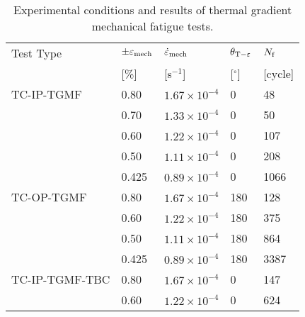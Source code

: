 \documentclass[preprint,5p,twocolumn,11pt,sort&compress]{elsarticle}
\begin{document}
\begin{table*}[htbp]
  \centering
  \caption{Experimental conditions and results of thermal gradient mechanical fatigue tests.}
    \begin{tabular}{p{4cm}p{1.5cm}<{\centering}p{3cm}<{\centering}p{1.5cm}<{\centering}p{1.5cm}<{\raggedleft}}
    \toprule
    Test Type & $\pm \varepsilon _{\rm{mech}}$ & $\dot \varepsilon _{\rm{mech}}$ & $\theta_{\rm{T-\varepsilon}}$ & $N_{\rm{f}}$ \\
          & [\%]  & [s$^{-1}$] & [$^\circ$] & [cycle] \\
    \midrule
    TC-IP-TGMF & 0.80  & $1.67\times 10^{-4}$ & 0     & 48 \\
          & 0.70  & $1.33\times 10^{-4}$ & 0     & 50 \\
          & 0.60  & $1.22\times 10^{-4}$ & 0     & 107 \\
          & 0.50  & $1.11\times 10^{-4}$ & 0     & 208 \\
          & 0.425  & $0.89\times 10^{-4}$ & 0     & 1066 \\
    \midrule
    TC-OP-TGMF & 0.80  & $1.67\times 10^{-4}$ & 180   & 128 \\
          & 0.60  & $1.22\times 10^{-4}$ & 180   & 375 \\
          & 0.50  & $1.11\times 10^{-4}$ & 180   & 864 \\
          & 0.425  & $0.89\times 10^{-4}$ & 180   & 3387 \\
    \midrule
    TC-IP-TGMF-TBC & 0.80  & $1.67\times 10^{-4}$ & 0     & 147 \\
          & 0.60  & $1.22\times 10^{-4}$ & 0     & 624 \\
    \bottomrule
    \end{tabular}%
  \label{Tab:test_matrix_TGMF}%
\end{table*}%
\end{document}
